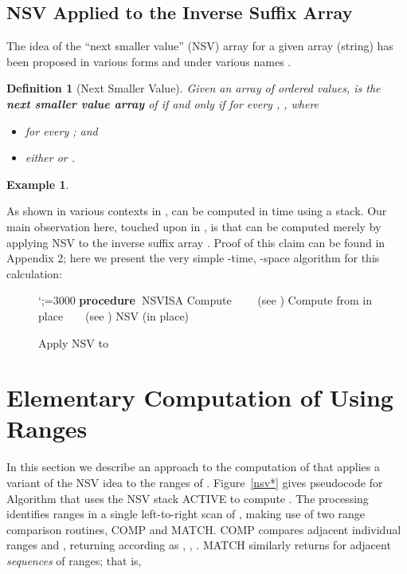 \documentclass[10pt]{llncs}
\newtheorem{defn}[thrm]{Definition}
\newtheorem{examp}[thrm]{Example}
\def\s#1{\mbox{\boldmath }}
\def\itbf#1{\textit{\textbf{#1}}}
\def\bproc{{\bf procedure\ }}
\begin{document}
\subsection{NSV Applied to the Inverse Suffix Array}
\label{subsect-nsvisa}
The idea of the ``next smaller value'' (NSV) array for a given array (string) \s{x}
has been proposed in various forms and under various names
\cite{AGKR02,FMN08,OG11,GB13}.
\begin{defn}[Next Smaller Value]
Given an array  of ordered values,
 is the \itbf{next smaller value array} of \s{x}
if and only if for every , , where
\begin{itemize}
\item[]
for every ; and
\item[]
either  or .
\end{itemize}
\end{defn}
\begin{examp}

\end{examp}
As shown in various contexts in \cite{GB13},
 can be computed in  time using a stack.
Our main observation here, touched upon in \cite{HR03},
is that  can be computed merely by applying NSV
to the inverse suffix array .
Proof of this claim can be found in Appendix 2;
here we present the very simple -time, -space algorithm for this calculation:
\begin{figure}[ht]


{\leftskip=3.4cm\obeylines\sfcode`;=3000
\bproc NSVISA
Compute \ \ \ \ (see \cite{NZC09,PST07})
Compute  from  in place\ \ \ \ (see \cite{PST07})
 NSV (in place)
}
\caption{Apply NSV to }
\label{fig-3line}
\end{figure}

\section{Elementary Computation of  Using Ranges}
\label{sect-newalgs}

In this section we describe an approach to the computation of 
that applies a variant of the NSV idea to the ranges of \s{x}.
Figure~\ref{nsv*} gives pseudocode for Algorithm 
that uses the NSV stack ACTIVE to compute .
The processing identifies ranges in a single left-to-right scan
of \s{x}, making use of two range comparison routines, COMP and MATCH.
COMP compares adjacent individual ranges \s{x_r} and \s{x_{r+1}}, returning 
according as , , .
MATCH similarly returns  for adjacent {\it sequences} of ranges; that is,
\end{document}
